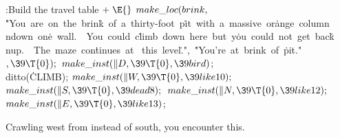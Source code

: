 \B{}:Build the travel table\X${}\mathrel+\E{}$\6
$\\{make\_loc}(\\{brink},{}$\6
\.{"You\ are\ on\ the\ brin}\)\.{k\ of\ a\ thirty-foot\ p}\)\.{it\ with\ a\ massive\ or}\)\.{ange\ column\\ndown\ on}\)\.{e\ wall.\ \ You\ could\ c}\)\.{limb\ down\ here\ but\ y}\)\.{ou\ could\ not\ get\ bac}\)\.{k\\nup.\ \ The\ maze\ con}\)\.{tinues\ at%
\ this\ level}\)\.{."}${},{}$\6
\.{"You're\ at\ brink\ of\ }\)\.{pit."}${},\39\T{0});{}$\6
${}\\{make\_inst}(\|D,\39\T{0},\39\\{bird}){}$;\5
\\{ditto}(\.{CLIMB});\6
${}\\{make\_inst}(\|W,\39\T{0},\39\\{like10});{}$\6
${}\\{make\_inst}(\|S,\39\T{0},\39\\{dead8});{}$\6
${}\\{make\_inst}(\|N,\39\T{0},\39\\{like12});{}$\6
${}\\{make\_inst}(\|E,\39\T{0},\39\\{like13}){}$;\par
\fi

Crawling west from  instead of south, you encounter this.

